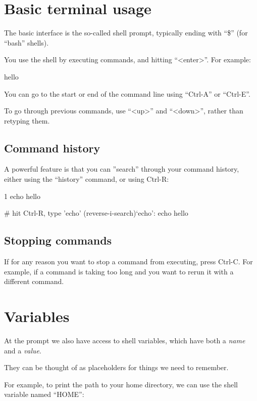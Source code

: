 \section{Basic terminal usage}

The basic interface is the so-called shell prompt, typically ending with ``\$''
(for ``bash'' shells).

You use the shell by executing commands, and hitting ``<enter>''. For example:

\begin{prompt}
hello
\end{prompt}

You can go to the start or end of the command line using ``Ctrl-A'' or ``Ctrl-E''.

To go through previous commands, use ``<up>'' and ``<down>'', rather than retyping them.

\subsection{Command history}

A powerful feature is that you can ''search'' through your command history, either using the ``history'' command, or using Ctrl-R:

\begin{prompt}
    1  echo hello

# hit Ctrl-R, type 'echo'
(reverse-i-search)`echo': echo hello
\end{prompt}

\subsection{Stopping commands}
If for any reason you want to stop a command from executing, press Ctrl-C. For
example, if a command is taking too long and you want to rerun it with a
different command.

\section{Variables}

At the prompt we also have access to shell variables, which have both a \emph{name} and a \emph{value}.

They can be thought of as placeholders for things we need to remember.

For example, to print the path to your home directory, we can use the shell variable named ``HOME'':

